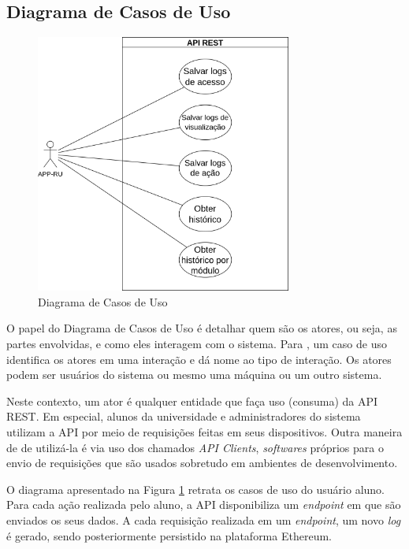 \subsection{Diagrama de Casos de Uso}
\begin{figure}
    \centering
    \includegraphics[width=0.75\textwidth]{img/Cap3/diagramas/Diagrama de Casos de Uso.png}
    \caption{Diagrama de Casos de Uso}
    \label{fig:diagrama_casos_uso}
\end{figure}
O papel do Diagrama de Casos de Uso é detalhar quem são os atores, ou seja, as partes envolvidas, e como eles interagem com o sistema. Para \cite{Sommerville2011}, um caso de uso identifica os atores em uma interação e dá nome ao tipo de interação. Os atores podem ser usuários do sistema ou mesmo uma máquina ou um outro sistema.

Neste contexto, um ator é qualquer entidade que faça uso (consuma) da API REST. Em especial, alunos da universidade e administradores do sistema utilizam a API por meio de requisições feitas em seus dispositivos. Outra maneira de de utilizá-la é via uso dos chamados \emph{API Clients}, \emph{softwares} próprios para o envio de requisições que são usados sobretudo em ambientes de desenvolvimento.

O diagrama apresentado na Figura \ref{fig:diagrama_casos_uso} retrata os casos de uso do usuário aluno. Para cada ação realizada pelo aluno, a API disponibiliza um \emph{endpoint} em que são enviados os seus dados. A cada requisição realizada em um \emph{endpoint}, um novo \emph{log} é gerado, sendo posteriormente persistido na plataforma Ethereum.

